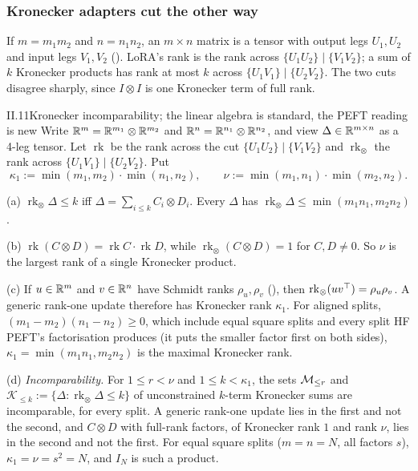 \subsubsection{Kronecker adapters cut the other way}\label{sec:cut-kronecker}

If $m=m_1m_2$ and $n=n_1n_2$, an $m\times n$ matrix is a tensor with output legs $U_1,U_2$ and input legs $V_1,V_2$
(). LoRA's rank is the rank across $\{U_1U_2\}\mid\{V_1V_2\}$; a sum of $k$ Kronecker products has rank at
most $k$ across $\{U_1V_1\}\mid\{U_2V_2\}$. The two cuts disagree sharply, since $I\otimes I$ is one Kronecker term of
full rank.

\begin{theorem}{II.11}{Kronecker incomparability; the linear algebra is standard, the PEFT reading is new}
Write $\mathbb{R}^m=\mathbb{R}^{m_1}\otimes\mathbb{R}^{m_2}$ and $\mathbb{R}^n=\mathbb{R}^{n_1}\otimes\mathbb{R}^{n_2}$, and view $\Delta\in\mathbb{R}^{m\times n}$ as a 4-leg
tensor. Let $\operatorname{rk}$ be the rank across the cut $\{U_1U_2\}\mid\{V_1V_2\}$ and $\operatorname{rk}_\otimes$
the rank across $\{U_1V_1\}\mid\{U_2V_2\}$. Put
\begin{equation*}
  \kappa_1:=\min(m_1,m_2)\cdot\min(n_1,n_2),\qquad\nu:=\min(m_1,n_1)\cdot\min(m_2,n_2).
\end{equation*}

(a) $\operatorname{rk}_\otimes\Delta\le k$ iff $\Delta=\sum_{i\le k}C_i\otimes D_i$. Every $\Delta$ has
$\operatorname{rk}_\otimes\Delta\le\min(m_1n_1,m_2n_2)$.

(b) $\operatorname{rk}(C\otimes D)=\operatorname{rk}C\cdot\operatorname{rk}D$, while
$\operatorname{rk}_\otimes(C\otimes D)=1$ for $C,D\ne0$. So $\nu$ is the largest rank of a single Kronecker product.

(c) If $u\in\mathbb{R}^m$ and $v\in\mathbb{R}^n$ have Schmidt ranks $\rho_u,\rho_v$ (), then
$\operatorname{rk}_\otimes(uv^{\top})=\rho_u\rho_v$. A generic rank-one update therefore has Kronecker rank $\kappa_1$. For
aligned splits, $(m_1-m_2)(n_1-n_2)\ge0$, which include equal square splits and every split HF PEFT's factorisation
produces (it puts the smaller factor first on both sides), $\kappa_1=\min(m_1n_1,m_2n_2)$ is the maximal Kronecker rank.

(d) \emph{Incomparability.} For $1\le r<\nu$ and $1\le k<\kappa_1$, the sets $\mathcal{M}_{\le r}$ and
$\mathcal K_{\le k}:=\{\Delta:\operatorname{rk}_\otimes\Delta\le k\}$ of unconstrained $k$-term Kronecker sums are
incomparable, for every split. A generic rank-one update lies in the first and not the second, and $C\otimes D$ with
full-rank factors, of Kronecker rank $1$ and rank $\nu$, lies in the second and not the first. For equal square splits
($m=n=N$, all factors $s$), $\kappa_1=\nu=s^2=N$, and $I_N$ is such a product.


\end{theorem}
